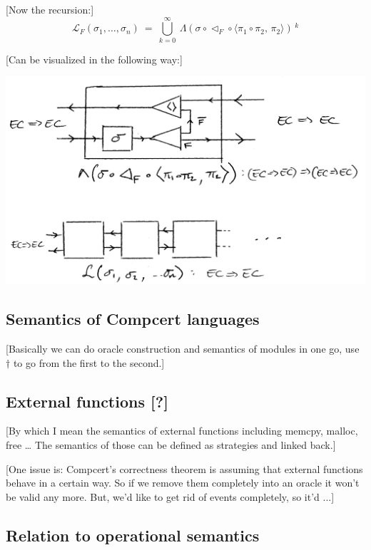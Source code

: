 \documentclass[acmsmall,anonymous]{acmart}
\begin{document}
[Now the recursion:]
\[
  \mathcal{L}_F(\sigma_1, \ldots, \sigma_n) \ =\ 
    \bigcup_{k=0}^\infty\ 
    \Lambda ( \sigma \circ \lhd_F \circ \langle \pi_1 \circ \pi_2, \, \pi_2 \rangle ) \,^k
\]

[Can be visualized in the following way:]
\begin{center}
  \includegraphics[scale=0.5]{linking-operator}
\end{center}


\subsection{Semantics of Compcert languages} %



[Basically we can do oracle construction and semantics of modules
in one go, use $\dagger$ to go from the first to the second.]




\subsection{External functions [?]} %

[By which I mean the semantics of external functions
including memcpy, malloc, free \ldots
The semantics of those can be defined as strategies
and linked back.]

[One issue is:
Compcert's correctness theorem is
assuming that external functions behave in a certain way.
So if we remove them completely into an oracle
it won't be valid any more.
But,
we'd like to get rid of events completely,
so it'd ...]


\subsection{Relation to operational semantics} %
\end{document}
